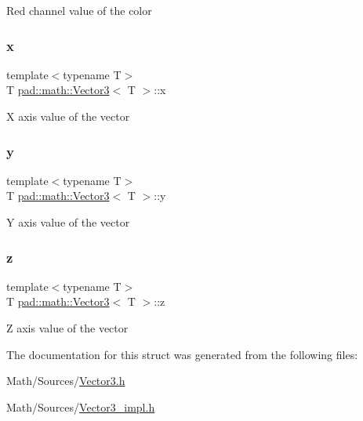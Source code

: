 Red channel value of the color \mbox{\label{structpad_1_1math_1_1_vector3_acf0b6cc0b4fb0a077945332e816e4373}} 
\subsubsection{\texorpdfstring{x}{x}}
{\footnotesize\ttfamily template$<$typename T$>$ \\
T \mbox{\hyperlink{structpad_1_1math_1_1_vector3}{pad\+::math\+::\+Vector3}}$<$ T $>$\+::x}

X axis value of the vector \mbox{\label{structpad_1_1math_1_1_vector3_af6d815461367ca4c2f85115453470934}} 
\subsubsection{\texorpdfstring{y}{y}}
{\footnotesize\ttfamily template$<$typename T$>$ \\
T \mbox{\hyperlink{structpad_1_1math_1_1_vector3}{pad\+::math\+::\+Vector3}}$<$ T $>$\+::y}

Y axis value of the vector \mbox{\label{structpad_1_1math_1_1_vector3_adcd03301042c390430955427765261e5}} 
\subsubsection{\texorpdfstring{z}{z}}
{\footnotesize\ttfamily template$<$typename T$>$ \\
T \mbox{\hyperlink{structpad_1_1math_1_1_vector3}{pad\+::math\+::\+Vector3}}$<$ T $>$\+::z}

Z axis value of the vector 

The documentation for this struct was generated from the following files\+:\begin{DoxyCompactItemize}
\item 
Math/\+Sources/\mbox{\hyperlink{_vector3_8h}{Vector3.\+h}}\item 
Math/\+Sources/\mbox{\hyperlink{_vector3__impl_8h}{Vector3\+\_\+impl.\+h}}\end{DoxyCompactItemize}

